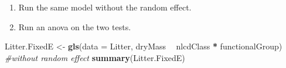 \documentclass[]{article}
\newenvironment{Shaded}{\begin{snugshade}}{\end{snugshade}}
\newcommand{\CommentTok}[1]{\textcolor[rgb]{0.56,0.35,0.01}{\textit{#1}}}
\newcommand{\DataTypeTok}[1]{\textcolor[rgb]{0.13,0.29,0.53}{#1}}
\newcommand{\KeywordTok}[1]{\textcolor[rgb]{0.13,0.29,0.53}{\textbf{#1}}}
\newcommand{\NormalTok}[1]{#1}
\newcommand{\OperatorTok}[1]{\textcolor[rgb]{0.81,0.36,0.00}{\textbf{#1}}}
\newcommand{\StringTok}[1]{\textcolor[rgb]{0.31,0.60,0.02}{#1}}
\providecommand{\tightlist}{%
  \setlength{\itemsep}{0pt}\setlength{\parskip}{0pt}}
\begin{document}
\begin{enumerate}
\def\labelenumi{\alph{enumi}.}
\setcounter{enumi}{2}
\tightlist
\item
  Run the same model without the random effect.
\item
  Run an anova on the two tests.
\end{enumerate}

\begin{Shaded}
\begin{Highlighting}[]
\NormalTok{ Litter.FixedE <-}\StringTok{ }\KeywordTok{gls}\NormalTok{(}\DataTypeTok{data =}\NormalTok{ Litter,}
\NormalTok{                  dryMass }\OperatorTok{~}\StringTok{ }\NormalTok{nlcdClass }\OperatorTok{*}\StringTok{ }\NormalTok{functionalGroup) }
\CommentTok{#without random effect}
\KeywordTok{summary}\NormalTok{(Litter.FixedE)}
\end{Highlighting}
\end{Shaded}
\end{document}
